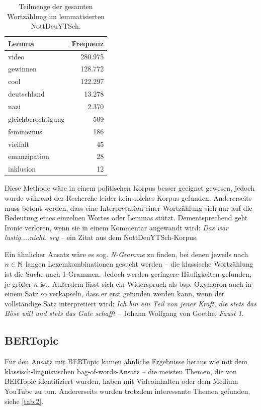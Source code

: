 \begin{table}
    \centering
    \begin{tabular}[c]{l r}
        \hline
        Lemma & Frequenz \\
        \hline \hline
        video & 280.975 \\
        gewinnen & 128.772 \\
        cool & 122.297 \\
        deutschland & 13.278 \\
        nazi & 2.370 \\
        gleichberechtigung & 509 \\
        feminismus & 186 \\
        vielfalt & 45 \\
        emanzipation & 28 \\
        inklusion & 12 \\
        \hline
    \end{tabular}
    \caption{Teilmenge der gesamten Wortzählung im lemmatisierten NottDeuYTSch.}
    \label{tab:1}
\end{table}

Diese Methode wäre in einem politischen Korpus besser geeignet gewesen, jedoch wurde während der Recherche leider kein solches Korpus gefunden.
Andererseits muss betont werden, dass eine Interpretation einer Wortzählung sich nur auf die Bedeutung eines einzelnen Wortes oder Lemmas stützt.
Dementsprechend geht Ironie verloren, wenn sie in einem Kommentar angewandt wird: \emph{Das war lustig....nicht. sry} -- ein Zitat aus dem NottDeuYTSch-Korpus.

Ein ähnlicher Ansatz wäre es sog. \emph{N-Gramme} zu finden, bei denen jeweils nach \(n \in \mathbb N\) langen Lexemkombinationen gesucht werden -- die klassische Wortzählung ist die Suche nach 1-Grammen.
Jedoch werden geringere Häufigkeiten gefunden, je größer \(n\) ist.
Außerdem lässt sich ein Widerspruch als bsp. Oxymoron auch in einem Satz so verkapseln, dass er erst gefunden werden kann, wenn der vollständige Satz interpretiert wird: \emph{Ich bin ein Teil von jener Kraft, die stets das Böse will und stets das Gute schafft} -- Johann Wolfgang von Goethe, \emph{Faust 1}.

\subsection{BERTopic}
Für den Ansatz mit BERTopic kamen ähnliche Ergebnisse heraus wie mit dem klassisch-linguistischen bag-of-words-Ansatz -- die meisten Themen, die von BERTopic identifiziert wurden, haben mit Videoinhalten oder dem Medium YouTube zu tun.
Andererseits wurden trotzdem interessante Themen gefunden, siehe \autoref{tab:2}.

